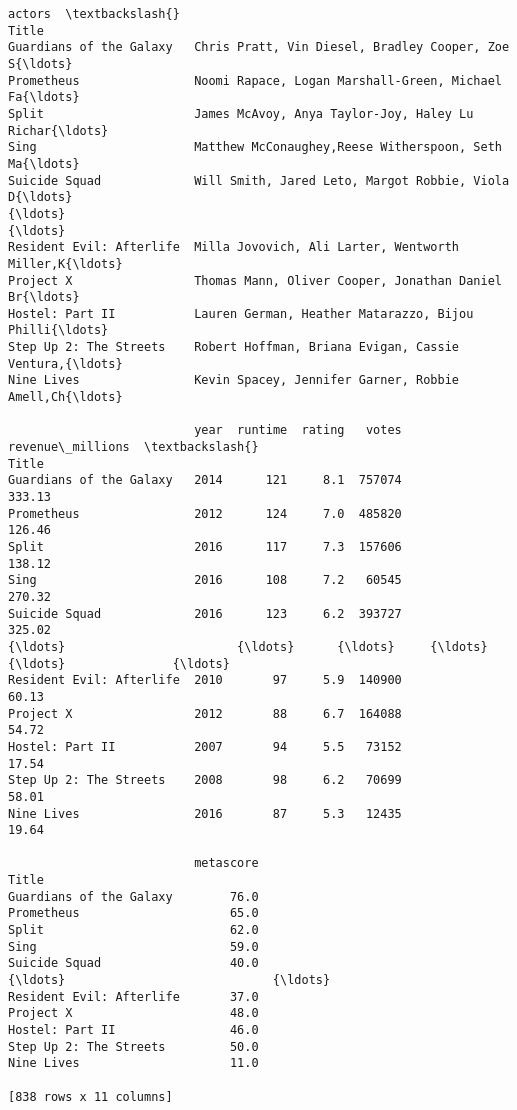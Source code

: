 \documentclass[11pt]{article}
\begin{document}
\begin{tcolorbox}[breakable, size=fbox, boxrule=.5pt, pad at break*=1mm, opacityfill=0]
\begin{Verbatim}[commandchars=\\\{\}]
                                                                     actors  \textbackslash{}
Title
Guardians of the Galaxy   Chris Pratt, Vin Diesel, Bradley Cooper, Zoe S{\ldots}
Prometheus                Noomi Rapace, Logan Marshall-Green, Michael Fa{\ldots}
Split                     James McAvoy, Anya Taylor-Joy, Haley Lu Richar{\ldots}
Sing                      Matthew McConaughey,Reese Witherspoon, Seth Ma{\ldots}
Suicide Squad             Will Smith, Jared Leto, Margot Robbie, Viola D{\ldots}
{\ldots}                                                                     {\ldots}
Resident Evil: Afterlife  Milla Jovovich, Ali Larter, Wentworth Miller,K{\ldots}
Project X                 Thomas Mann, Oliver Cooper, Jonathan Daniel Br{\ldots}
Hostel: Part II           Lauren German, Heather Matarazzo, Bijou Philli{\ldots}
Step Up 2: The Streets    Robert Hoffman, Briana Evigan, Cassie Ventura,{\ldots}
Nine Lives                Kevin Spacey, Jennifer Garner, Robbie Amell,Ch{\ldots}

                          year  runtime  rating   votes  revenue\_millions  \textbackslash{}
Title
Guardians of the Galaxy   2014      121     8.1  757074            333.13
Prometheus                2012      124     7.0  485820            126.46
Split                     2016      117     7.3  157606            138.12
Sing                      2016      108     7.2   60545            270.32
Suicide Squad             2016      123     6.2  393727            325.02
{\ldots}                        {\ldots}      {\ldots}     {\ldots}     {\ldots}               {\ldots}
Resident Evil: Afterlife  2010       97     5.9  140900             60.13
Project X                 2012       88     6.7  164088             54.72
Hostel: Part II           2007       94     5.5   73152             17.54
Step Up 2: The Streets    2008       98     6.2   70699             58.01
Nine Lives                2016       87     5.3   12435             19.64

                          metascore
Title
Guardians of the Galaxy        76.0
Prometheus                     65.0
Split                          62.0
Sing                           59.0
Suicide Squad                  40.0
{\ldots}                             {\ldots}
Resident Evil: Afterlife       37.0
Project X                      48.0
Hostel: Part II                46.0
Step Up 2: The Streets         50.0
Nine Lives                     11.0

[838 rows x 11 columns]
\end{Verbatim}
\end{tcolorbox}
        
\end{document}
